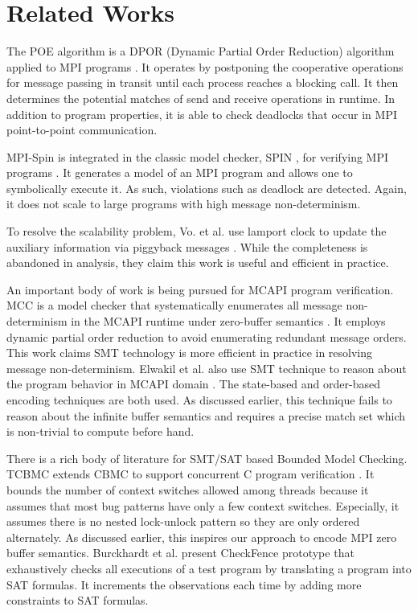\section{Related Works}
The POE algorithm is a DPOR (Dynamic Partial Order Reduction) algorithm \cite{DBLP:conf/popl/FlanaganG05} applied to MPI programs \cite{DBLP:conf/ppopp/VakkalankaSGK08}. It operates by postponing the cooperative operations for message passing in transit until each process reaches a blocking call. It then determines the potential matches of send and receive operations in runtime. In addition to program properties, it is able to check deadlocks that occur in MPI point-to-point communication.

MPI-Spin is integrated in the classic model checker, SPIN \cite{DBLP:journals/tse/Holzmann97}, for verifying MPI programs \cite{DBLP:conf/vmcai/Siegel07}. It generates a model of an MPI program and allows one to symbolically execute it. As such, violations such as deadlock are detected. Again, it does not scale to large programs with high message non-determinism.

To resolve the scalability problem, Vo. et al. use lamport clock to update the auxiliary information via piggyback messages \cite{DBLP:conf/sc/VoAGSSB10, DBLP:conf/IEEEpact/VoGKSSB11}. While the completeness is abandoned in analysis, they claim this work is useful and efficient in practice. 

An important body of work is being pursued for MCAPI program verification. MCC is a model checker that systematically enumerates all message non-determinism in the MCAPI runtime under zero-buffer semantics \cite{DBLP:conf/fmcad/SharmaGMH09}. It employs dynamic partial order reduction to avoid enumerating redundant message orders. This work claims SMT technology is more efficient in practice in resolving message non-determinism. Elwakil et al. also use SMT technique to reason about the program behavior in MCAPI domain \cite{DBLP:conf/issta/ElwakilY10}. The state-based and order-based encoding techniques are both used. As discussed earlier, this technique fails to reason about the infinite buffer semantics and requires a precise match set which is non-trivial to compute before hand.

There is a rich body of literature for SMT/SAT based Bounded Model Checking. 
TCBMC extends CBMC \cite{DBLP:conf/tacas/ClarkeKL04} to support concurrent C program verification \cite{DBLP:conf/cav/RabinovitzG05}. It bounds the number of context switches allowed among threads because it assumes that most bug patterns have only a few context switches. Especially, it assumes there is no nested lock-unlock pattern so they are only ordered alternately. As discussed earlier, this inspires our approach to encode MPI zero buffer semantics.
Burckhardt et al. present CheckFence prototype \cite{DBLP:conf/pldi/BurckhardtAM07} that exhaustively checks all executions of a test program by translating a program into SAT formulas. It increments the observations each time by adding more constraints to SAT formulas. 
